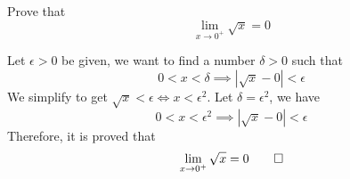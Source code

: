 \begin{problem}
    Prove that \[\lim_{x\to 0^+}\sqrt{x}=0\]
\end{problem}
\begin{solution}
    Let \(\epsilon>0\) be given, we want to find a number \(\delta>0\) such
    that \[0<x<\delta\implies|\sqrt{x}-0|<\epsilon\]
    We simplify to get \(\sqrt{x}<\epsilon\iff x<\epsilon^2\).
    Let \(\delta=\epsilon^2\), we have
    \[0<x<\epsilon^2\implies|\sqrt{x}-0|<\epsilon\]
    Therefore, it is proved that \[\lim_{x\to 0^+}\sqrt{x}=0\qedhere\]
\end{solution}